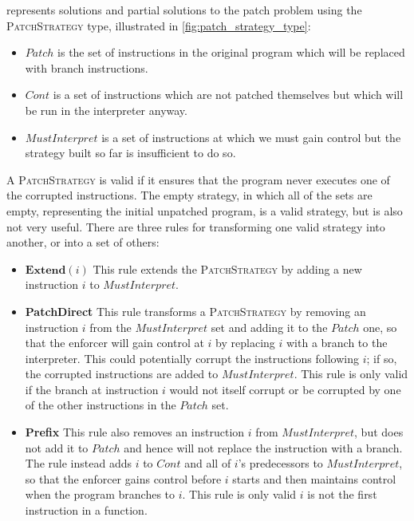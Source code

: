 {\Implementation} represents solutions and partial solutions to the
patch problem using the \textsc{PatchStrategy} type, illustrated in
\autoref{fig:patch_strategy_type}:
\begin{itemize}
\item $\mathit{Patch}$ is the set of instructions in the original
  program which will be replaced with branch instructions.
\item $\mathit{Cont}$ is a set of instructions which are not patched
  themselves but which will be run in the interpreter anyway.
\item $\mathit{MustInterpret}$ is a set of instructions at which we
  must gain control but the strategy built so far is insufficient to
  do so.
\end{itemize}
A \textsc{PatchStrategy} is valid if it ensures that the program never
executes one of the corrupted instructions.  The empty strategy, in
which all of the sets are empty, representing the initial unpatched
program, is a valid strategy, but is also not very useful.  There are
three rules for transforming one valid strategy into another, or into
a set of others:
\begin{itemize}
\item
  $\textbf{Extend}(i)$ This rule extends the \textsc{PatchStrategy} by
  adding a new instruction $i$ to $\mathit{MustInterpret}$.
\item
  \textbf{PatchDirect} This rule transforms a \textsc{PatchStrategy}
  by removing an instruction $i$ from the $\mathit{MustInterpret}$ set
  and adding it to the $\mathit{Patch}$ one, so that the enforcer will
  gain control at $i$ by replacing $i$ with a branch to the
  interpreter.  This could potentially corrupt the instructions
  following $i$; if so, the corrupted instructions are added to
  $\mathit{MustInterpret}$.  This rule is only valid if the branch at
  instruction $i$ would not itself corrupt or be corrupted by one of
  the other instructions in the $\mathit{Patch}$ set.
\item
  \textbf{Prefix} This rule also removes an instruction $i$ from
  $\mathit{MustInterpret}$, but does not add it to $\mathit{Patch}$
  and hence will not replace the instruction with a branch.  The rule
  instead adds $i$ to $\mathit{Cont}$ and all of $i$'s predecessors to
  $\mathit{MustInterpret}$, so that the enforcer gains control before
  $i$ starts and then maintains control when the program branches to
  $i$.  This rule is only valid $i$ is not the first instruction in a
  function.
\end{itemize}

